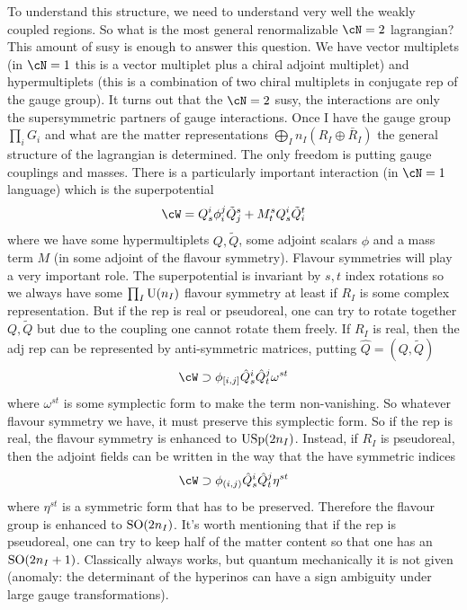 To understand this structure, we need to understand very well the weakly coupled regions. So what is the most general renormalizable $\cN=2$ lagrangian?  This amount of susy is enough to answer this question. We have vector multiplets (in $\cN=1$ this is a vector multiplet plus a chiral adjoint multiplet) and hypermultiplets (this is a combination of two chiral multiplets in conjugate rep of the gauge group). It turns out that the $\cN=2$ susy, the interactions are only the supersymmetric partners of gauge interactions. Once I have the gauge group $\prod_{i}G_{i}$ and what are the matter representations $\bigoplus_{I}n_{I}(R_{I}\oplus \bar R_{I})$ the general structure of the lagrangian is determined. The only freedom is putting gauge couplings and masses. There is a particularly important interaction (in $\cN=1$ language) which is the superpotential 
\begin{equation}
	\cW=Q_{s}^{i}\phi_{i}^{j}\tilde Q_{{j}}^{s}+M_{t}^{s}Q_{s}^{i}\tilde Q_{i}^{t}
\end{equation}
where we have some hypermultiplets $Q,\tilde Q$, some adjoint scalars $\phi$ and a mass term $M$ (in some adjoint of the flavour symmetry). Flavour symmetries will play a very important role. The superpotential is invariant by $s,t$ index rotations so we always have some $\prod_{I}\mathrm{U}(n_{I})$ flavour symmetry at least if $R_{I}$ is some complex representation. But if the rep is real or pseudoreal, one can try to rotate together $Q,\tilde Q$ but due to the coupling one cannot rotate them freely. If $R_{I}$ is real, then the adj rep can be represented by anti-symmetric matrices, putting $\hat{Q}=(Q,\tilde Q)$
\begin{equation}
	\cW\supset \phi_{\comm{i}{j}}\hat{Q}^{i}_{s}\hat{Q}^{j}_{t}\omega^{st}
\end{equation}
where $\omega^{st}$ is some symplectic form to make the term non-vanishing. So whatever flavour symmetry we have, it must preserve this symplectic form. So if the rep is real, the flavour symmetry is enhanced to $\mathrm{USp}(2n_{I})$. Instead, if $R_{I}$ is pseudoreal, then the adjoint fields can be written in the way that the have symmetric indices 
\begin{equation}
	\cW\supset \phi_{(i,j)}\hat{Q}^{i}_{s}\hat{Q}^{j}_{t}\eta^{st}
\end{equation}
where $\eta^{st}$ is a symmetric form that has to be preserved. Therefore the flavour group is enhanced to $\mathrm{SO}(2n_{I})$. It's worth mentioning that if the rep is pseudoreal, one can try to keep half of the matter content so that one has an $\mathrm{SO}(2n_{I}+1)$. Classically always works, but quantum mechanically it is not given (anomaly: the determinant of the hyperinos can have a sign ambiguity under large gauge transformations).

